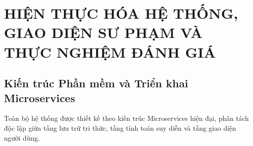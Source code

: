
\chapter{HIỆN THỰC HÓA HỆ THỐNG, GIAO DIỆN SƯ PHẠM VÀ THỰC NGHIỆM ĐÁNH GIÁ}
\label{chap:implementation}

\section{Kiến trúc Phần mềm và Triển khai Microservices}
Toàn bộ hệ thống được thiết kế theo kiến trúc Microservices hiện đại, phân tách độc lập giữa tầng lưu trữ tri thức, tầng tính toán suy diễn và tầng giao diện người dùng.

